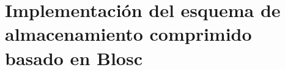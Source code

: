 \section{Implementación del esquema de almacenamiento comprimido basado en Blosc}
\label{sec:development}








